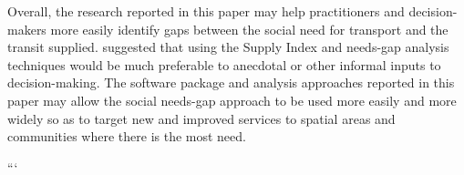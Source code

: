 \documentclass[preprint, 3p,
authoryear]{elsarticle} %
\begin{document}
Overall, the research reported in this paper may help practitioners and
decision-makers more easily identify gaps between the social need for
transport and the transit supplied. \citet{currie2010identifying}
suggested that using the Supply Index and needs-gap analysis techniques
would be much preferable to anecdotal or other informal inputs to
decision-making. The software package and analysis approaches reported
in this paper may allow the social needs-gap approach to be used more
easily and more widely so as to target new and improved services to
spatial areas and communities where there is the most need.

```


\end{document}
